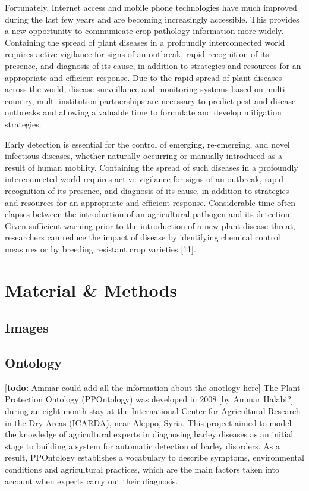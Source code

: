 \documentclass{frontiersSCNS} %
\newcommand{\todo}[1]{
  \rule{0pt}{0pt}\marginpar{{\color{blue}\rule{1ex}{1ex}}}
  {[\textbf{\color{blue}todo:} #1]}}
\begin{document}
Fortunately, Internet access and mobile phone technologies have much improved during the last few years and are becoming increasingly accessible. This provides a new opportunity to communicate crop pathology information more widely. Containing the spread of plant diseases in a profoundly interconnected world requires active vigilance for signs of an outbreak, rapid recognition of its presence, and diagnosis of its cause, in addition to strategies and resources for an appropriate and efficient response. Due to the rapid spread of plant diseases across the world, disease surveillance and monitoring systems based on multi-country, multi-institution partnerships are necessary to predict pest and disease outbreaks and allowing a valuable time to formulate and develop mitigation strategies. 

Early detection is essential for the control of emerging, re-emerging, and novel infectious diseases, whether naturally occurring or manually introduced as a result of human mobility. Containing the spread of such diseases in a profoundly interconnected world requires active vigilance for signs of an outbreak, rapid recognition of its presence, and diagnosis of its cause, in addition to strategies and resources for an appropriate and efficient response. Considerable time often elapses between the introduction of an agricultural pathogen and its detection. Given sufficient warning prior to the introduction of a new plant disease threat, researchers can reduce the impact of disease by identifying chemical control measures or by breeding resistant crop varieties [11].  

\section{Material \& Methods}

\subsection{Images}


\subsection{Ontology}
\todo{Ammar could add all the information about the onotlogy here}
The Plant Protection Ontology (PPOntology) was developed in 2008 [by Ammar Halabi?] during an eight-month stay at the International Center for Agricultural Research in the Dry Areas (ICARDA), near Aleppo, Syria. This project aimed to model the knowledge of agricultural experts in diagnosing barley diseases as an initial stage to building a system for automatic detection of barley disorders. As a result, PPOntology establishes a vocabulary to describe symptoms, environmental conditions and agricultural practices, which are the main factors taken into account when experts carry out their diagnosis.
\end{document}
